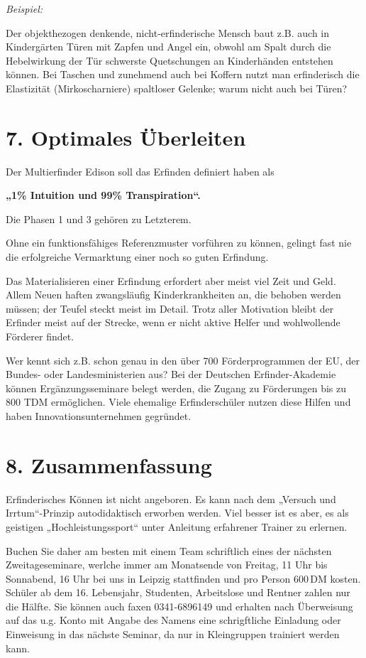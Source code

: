 \documentclass[11pt,a4paper]{article}
\begin{document}
\emph{Beispiel:}

Der objekthezogen denkende, nicht-erfinderische Mensch baut z.B. auch in
Kindergärten Türen mit Zapfen und Angel ein, obwohl am Spalt durch die
Hebelwirkung der Tür schwerste Quetschungen an Kinderhänden entstehen können.
Bei Taschen und zunehmend auch bei Koffern nutzt man erfinderisch die
Elastizität (Mirkoscharniere) spaltloser Gelenke; warum nicht auch bei Türen?

\section*{7. Optimales Überleiten}

Der Multierfinder Edison  soll das Erfinden definiert haben als
\begin{center}\bf  
  „1\% Intuition und  99\% Transpiration“.
\end{center}
Die Phasen 1 und 3 gehören zu Letzterem.

Ohne ein funktionsfähiges Referenzmuster vorführen zu können, gelingt fast
nie die erfolgreiche Vermarktung einer noch so guten Erfindung.

Das Materialisieren einer Erfindung erfordert aber meist viel Zeit und Geld.
Allem Neuen haften zwangsläufig Kinderkrankheiten an, die behoben werden
müssen; der Teufel steckt meist im Detail.  Trotz aller Motivation bleibt der
Erfinder meist auf der Strecke, wenn er nicht aktive Helfer und wohlwollende
Förderer findet.

Wer kennt sich z.B.  schon genau in den über 700 Förderprogrammen der EU, der
Bundes- oder Landesministerien aus?  Bei der Deutschen Erfinder-Akademie
können Ergänzungsseminare belegt werden, die Zugang zu Förderungen bis zu 800
TDM ermöglichen. Viele ehemalige Erfinderschüler nutzen diese Hilfen und haben
Innovationsunternehmen gegründet.

\section*{8. Zusammenfassung}

Erfinderisches Können ist nicht angeboren.  Es kann nach dem „Versuch und
Irrtum“-Prinzip autodidaktisch erworben werden.  Viel besser ist es aber, es
als geistigen „Hochleistungssport“ unter Anleitung erfahrener Trainer zu
erlernen.

Buchen Sie daher am besten mit einem Team schriftlich eines der nächsten
Zweitageseminare, werlche immer am Monatsende von Freitag, 11 Uhr bis
Sonnabend, 16 Uhr bei uns in Leipzig stattfinden und pro Person 600\,DM
kosten.  Schüler ab dem 16. Lebensjahr, Studenten, Arbeitslose und Rentner
zahlen nur die Hälfte. Sie können auch faxen 0341-6896149 und erhalten nach
Überweisung auf das u.g. Konto mit Angabe des Namens eine schrigftliche
Einladung oder Einweisung in das nächste Seminar, da nur in Kleingruppen
trainiert werden kann.
\end{document}
